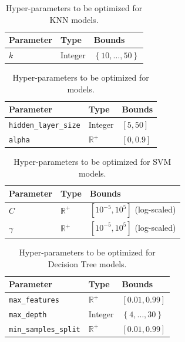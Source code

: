 \documentclass[twoside,11pt]{article}
\begin{document}
\begin{table}[ht]
\centering
\begin{tabular}{@{}lll@{}}
\toprule
\textbf{Parameter} & \textbf{Type} & \textbf{Bounds}                           \\ \midrule
$k$                & Integer       & $\left\lbrace 10, \dots,50 \right\rbrace$
\end{tabular}
\caption{Hyper-parameters to be optimized for KNN models.}
\label{knnparam}
\end{table}

\begin{table}[ht]
\centering
\begin{tabular}{lll}
\hline
\textbf{Parameter}             & \textbf{Type}    & \textbf{Bounds}       \\ \hline
\texttt{hidden\_layer\_size} & Integer          & $\left[5, 50\right]$  \\
\texttt{alpha}               & $\mathbb{R}^{+}$ & $\left[0, 0.9\right]$
\end{tabular}
\caption{Hyper-parameters to be optimized for \MLP models.}
\label{mlpparam}
\end{table}

\begin{table}[ht]
\centering
\begin{tabular}{@{}lll@{}}
\toprule
\textbf{Parameter} & \textbf{Type}                      & \textbf{Bounds}               \\ \midrule
$C$                & $\mathbb{R}^+$ & $\left[ 10^{-5}, 10^{5} \right]$ (log-scaled) \\
$\gamma$           & $\mathbb{R}^+$ & $\left[10^{-5}, 10^{5} \right]$  (log-scaled)       \\ \bottomrule
\end{tabular}
\caption{Hyper-parameters to be optimized for SVM models.}
\label{svmparam}
\end{table}

\begin{table}[ht]
\centering
\begin{tabular}{@{}lll@{}}
\toprule
\textbf{Parameter}             & \textbf{Type}  & \textbf{Bounds}                          \\ \midrule
\texttt{max\_features}      & $\mathbb{R}^+$ & $\left[0.01, 0.99\right]$   \\
\texttt{max\_depth}          & Integer        & $\left\lbrace 4, \dots, 30 \right\rbrace$ \\
\texttt{min\_samples\_split}  & $\mathbb{R}^+$  & $\left[0.01, 0.99\right]$
\end{tabular}
\caption{Hyper-parameters to be optimized for Decision Tree models.}
\label{treeparam}
\end{table}
\end{document}
